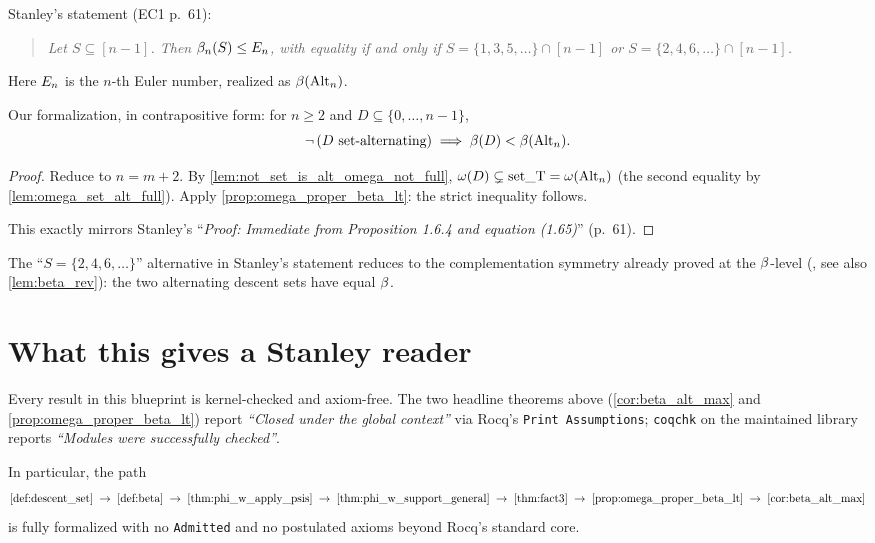 \begin{corollary}
  \label{cor:beta_alt_max}
  \rocqok
  Stanley's statement (EC1 p.~61):
  \begin{quote}
    \emph{Let $S \subseteq [n-1]$.  Then $\beta_n(S) \leq E_n$,
    with equality if and only if $S = \{1, 3, 5, \dots\} \cap [n-1]$
    or $S = \{2, 4, 6, \dots\} \cap [n-1]$.}
  \end{quote}
  Here $E_n$ is the $n$-th Euler number, realized as
  $\beta(\mathrm{Alt}_n)$.

  Our formalization, in contrapositive form:  for $n \geq 2$ and
  $D \subseteq \{0, \dots, n-1\}$,
  \[
    \neg\,(D \text{ set-alternating})
    \;\Longrightarrow\;
    \beta(D) < \beta(\mathrm{Alt}_n).
  \]

  \begin{proof}[Proof]
    Reduce to $n = m + 2$.  By
    \cref{lem:not_set_is_alt_omega_not_full},
    $\omega(D) \subsetneq \mathrm{set\_T} = \omega(\mathrm{Alt}_n)$
    (the second equality by \cref{lem:omega_set_alt_full}).  Apply
    \cref{prop:omega_proper_beta_lt}: the strict inequality follows.

    This exactly mirrors Stanley's
    ``\emph{Proof: Immediate from Proposition 1.6.4 and equation
    (1.65)}'' (p.~61).
  \end{proof}

  \medskip
  The ``$S = \{2, 4, 6, \dots\}$'' alternative in Stanley's statement
  reduces to the complementation symmetry already proved at the
  $\beta$-level (, see
  also \cref{lem:beta_rev}): the two alternating descent sets have
  equal $\beta$.
\end{corollary}

\section{What this gives a Stanley reader}

\begin{remark}
  \label{rem:end_to_end}
  Every result in this blueprint is kernel-checked and axiom-free.
  The two headline theorems above (\cref{cor:beta_alt_max} and
  \cref{prop:omega_proper_beta_lt}) report
  \emph{``Closed under the global context''} via Rocq's
  \texttt{Print Assumptions}; \texttt{coqchk} on the maintained
  library reports \emph{``Modules were successfully checked''}.

  In particular, the path
  \[
    \cref{def:descent_set} \;\to\;
    \cref{def:beta} \;\to\;
    \cref{thm:phi_w_apply_psis} \;\to\;
    \cref{thm:phi_w_support_general} \;\to\;
    \cref{thm:fact3} \;\to\;
    \cref{prop:omega_proper_beta_lt} \;\to\;
    \cref{cor:beta_alt_max}
  \]
  is fully formalized with no \texttt{Admitted} and no postulated
  axioms beyond Rocq's standard core.
\end{remark}
